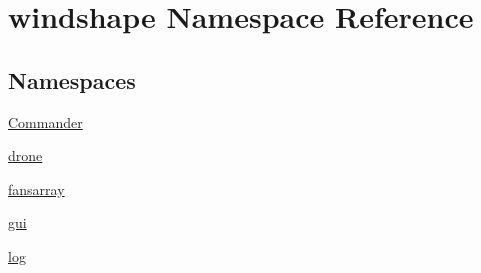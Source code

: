 \hypertarget{namespacewindshape}{}\section{windshape Namespace Reference}
\label{namespacewindshape}
\subsection*{Namespaces}
\begin{DoxyCompactItemize}
\item 
 \mbox{\hyperlink{namespacewindshape_1_1_commander}{Commander}}
\item 
 \mbox{\hyperlink{namespacewindshape_1_1drone}{drone}}
\item 
 \mbox{\hyperlink{namespacewindshape_1_1fansarray}{fansarray}}
\item 
 \mbox{\hyperlink{namespacewindshape_1_1gui}{gui}}
\item 
 \mbox{\hyperlink{namespacewindshape_1_1log}{log}}
\end{DoxyCompactItemize}
